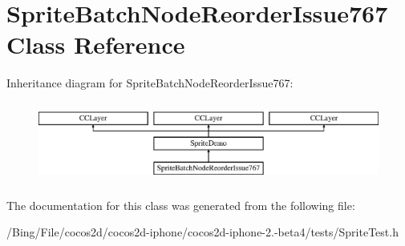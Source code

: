 \hypertarget{interface_sprite_batch_node_reorder_issue767}{\section{Sprite\-Batch\-Node\-Reorder\-Issue767 Class Reference}
\label{interface_sprite_batch_node_reorder_issue767}
}
Inheritance diagram for Sprite\-Batch\-Node\-Reorder\-Issue767\-:\begin{figure}[H]
\begin{center}
\leavevmode
\includegraphics[height=2.654028cm]{interface_sprite_batch_node_reorder_issue767}
\end{center}
\end{figure}


The documentation for this class was generated from the following file\-:\begin{DoxyCompactItemize}
\item 
/\-Bing/\-File/cocos2d/cocos2d-\/iphone/cocos2d-\/iphone-\/2.-\/beta4/tests/Sprite\-Test.\-h\end{DoxyCompactItemize}
